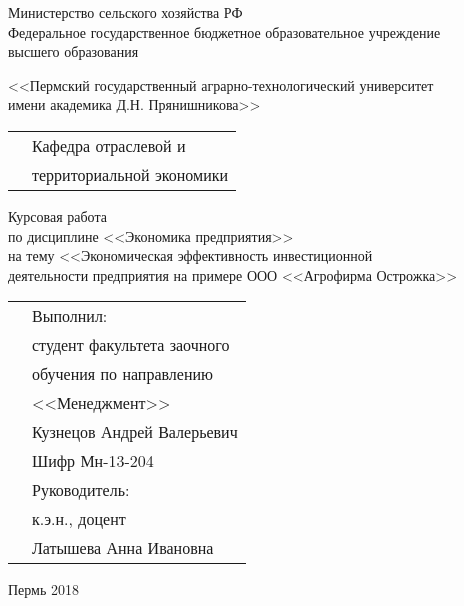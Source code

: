 \thispagestyle{empty}
\begin{center}
	Министерство сельского хозяйства РФ \\Федеральное государственное бюджетное образовательное учреждение\\ высшего образования
	\vspace{0.5ex}
	
	<<Пермский государственный аграрно-технологический университет\\ имени академика Д.Н. Прянишникова>>
\end{center}
\vspace{10ex}
\begin{tabularx}{\textwidth}{XX}
	& Кафедра отраслевой и \\
	& территориальной экономики
\end{tabularx}
\begin{center}
	\vspace{13ex}
	Курсовая работа\\
	по дисциплине <<Экономика предприятия>> \\
	\vspace{1ex}
	на тему <<Экономическая эффективность инвестиционной\\ деятельности предприятия на примере ООО <<Агрофирма Острожка>>
%	
\end{center}
	\vspace{8ex}
	\begin{tabularx}{\textwidth}{XX}
	& Выполнил:\\
	& студент факультета заочного \\
	& обучения по направлению \\
	& <<Менеджмент>> \\
	& Кузнецов Андрей Валерьевич \\
	& Шифр Мн-13-204\\
	& Руководитель:\\
	& к.э.н., доцент\\
	& Латышева Анна Ивановна\\
	\end{tabularx}
\begin{center}
	\vfill
	Пермь 2018
\end{center}
